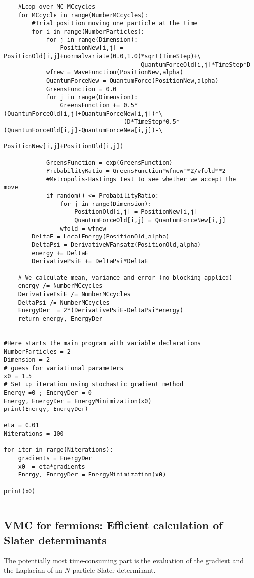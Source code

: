 \begin{verbatim}
    #Loop over MC MCcycles
    for MCcycle in range(NumberMCcycles):
        #Trial position moving one particle at the time
        for i in range(NumberParticles):
            for j in range(Dimension):
                PositionNew[i,j] = PositionOld[i,j]+normalvariate(0.0,1.0)*sqrt(TimeStep)+\
                                       QuantumForceOld[i,j]*TimeStep*D
            wfnew = WaveFunction(PositionNew,alpha)
            QuantumForceNew = QuantumForce(PositionNew,alpha)
            GreensFunction = 0.0
            for j in range(Dimension):
                GreensFunction += 0.5*(QuantumForceOld[i,j]+QuantumForceNew[i,j])*\
	                              (D*TimeStep*0.5*(QuantumForceOld[i,j]-QuantumForceNew[i,j])-\
                                      PositionNew[i,j]+PositionOld[i,j])
      
            GreensFunction = exp(GreensFunction)
            ProbabilityRatio = GreensFunction*wfnew**2/wfold**2
            #Metropolis-Hastings test to see whether we accept the move
            if random() <= ProbabilityRatio:
                for j in range(Dimension):
                    PositionOld[i,j] = PositionNew[i,j]
                    QuantumForceOld[i,j] = QuantumForceNew[i,j]
                wfold = wfnew
        DeltaE = LocalEnergy(PositionOld,alpha)
        DeltaPsi = DerivativeWFansatz(PositionOld,alpha)
        energy += DeltaE
        DerivativePsiE += DeltaPsi*DeltaE
            
    # We calculate mean, variance and error (no blocking applied)
    energy /= NumberMCcycles
    DerivativePsiE /= NumberMCcycles
    DeltaPsi /= NumberMCcycles
    EnergyDer  = 2*(DerivativePsiE-DeltaPsi*energy)
    return energy, EnergyDer


#Here starts the main program with variable declarations
NumberParticles = 2
Dimension = 2
# guess for variational parameters
x0 = 1.5
# Set up iteration using stochastic gradient method
Energy =0 ; EnergyDer = 0
Energy, EnergyDer = EnergyMinimization(x0)
print(Energy, EnergyDer)

eta = 0.01
Niterations = 100

for iter in range(Niterations):
    gradients = EnergyDer
    x0 -= eta*gradients
    Energy, EnergyDer = EnergyMinimization(x0)

print(x0)


\end{verbatim}


\subsection*{VMC for fermions: Efficient calculation of Slater determinants}
The potentially most time-consuming part is the
evaluation of the gradient and the Laplacian of an $N$-particle  Slater
determinant. 

